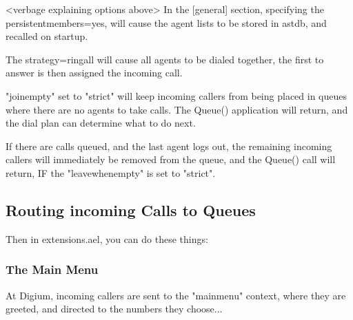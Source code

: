<verbage explaining options above>
In the [general] section, specifying the persistentmembers=yes,
will cause the agent lists to be stored in astdb, and 
recalled on startup.

The strategy=ringall will cause all agents to be dialed
together, the first to answer is then assigned the incoming
call. 

"joinempty" set to "strict" will keep incoming callers from
being placed in queues where there are no agents to take calls.
The Queue() application will return, and the dial plan can 
determine what to do next.

If there are calls queued, and the last agent logs out, the
remaining incoming callers will immediately be removed from
the queue, and the Queue() call will return, IF the "leavewhenempty" is
set to "strict".

\subsection{Routing incoming Calls to Queues}


Then in extensions.ael, you can do these things:

\subsubsection{The Main Menu} 

At Digium, incoming callers are sent to the "mainmenu" context, where they
are greeted, and directed to the numbers they choose...

